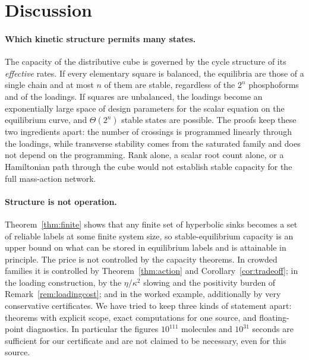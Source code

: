 \section{Discussion}\label{sec:discussion}

\paragraph{Which kinetic structure permits many states.}
The capacity of the distributive cube is governed by the cycle structure of its
\emph{effective} rates. If every elementary square is balanced, the equilibria are those of a
single chain and at most \(n\) of them are stable, regardless of the \(2^n\) phosphoforms and
of the loadings. If squares are unbalanced, the loadings become an exponentially large space of
design parameters for the scalar equation on the equilibrium curve, and
\(\Theta(2^n)\) stable states are possible. The proofs keep these two ingredients apart: the
number of crossings is programmed linearly through the loadings, while transverse stability
comes from the saturated family and does not depend on the programming. Rank alone, a scalar
root count alone, or a Hamiltonian path through the cube would not establish stable capacity
for the full mass-action network.

\paragraph{Structure is not operation.}
Theorem~\ref{thm:finite} shows that any finite set of hyperbolic sinks becomes a set of
reliable labels at some finite system size, so stable-equilibrium capacity is an upper bound on
what can be stored in equilibrium labels and is attainable in principle. The price is not
controlled by the capacity theorems. In crowded families it is controlled by
Theorem~\ref{thm:action} and Corollary~\ref{cor:tradeoff}; in the loading construction, by the
\(\eta/\kappa^2\) slowing and the positivity burden of Remark~\ref{rem:loadingcost}; and in the
worked example, additionally by very conservative certificates. We have tried to keep three
kinds of statement apart: theorems with explicit scope, exact computations for one source, and
floating-point diagnostics. In particular the figures \(10^{111}\) molecules and
\(10^{31}\) seconds are sufficient for our certificate and are not claimed to be necessary,
even for this source.

